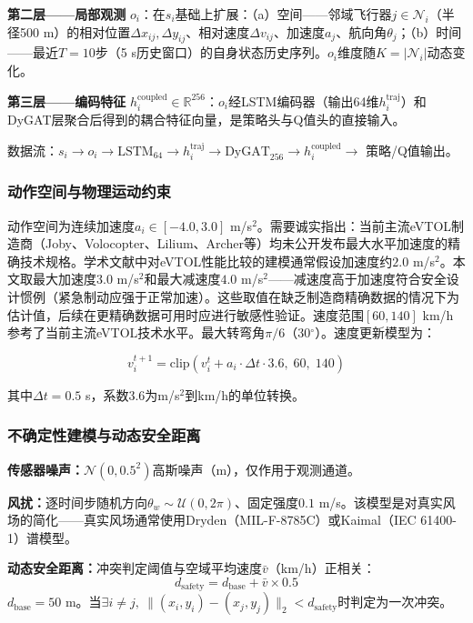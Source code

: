 \documentclass[12pt,a4paper,UTF8]{ctexart}
\begin{document}
\textbf{第二层——局部观测} $o_i$：在$s_i$基础上扩展：（a）空间——邻域飞行器$j \in \mathcal{N}_i$（半径500 m）的相对位置$\Delta x_{ij}, \Delta y_{ij}$、相对速度$\Delta v_{ij}$、加速度$a_j$、航向角$\theta_j$；（b）时间——最近$T=10$步（5 s历史窗口）的自身状态历史序列。$o_i$维度随$K = |\mathcal{N}_i|$动态变化。

\textbf{第三层——编码特征} $h_i^{\text{coupled}} \in \mathbb{R}^{256}$：$o_i$经LSTM编码器（输出64维$h_i^{\text{traj}}$）和DyGAT层聚合后得到的耦合特征向量，是策略头与Q值头的直接输入。

数据流：$s_i \to o_i \to \text{LSTM}_{64} \to h_i^{\text{traj}} \to \text{DyGAT}_{256} \to h_i^{\text{coupled}} \to$ 策略/Q值输出。

\subsubsection{动作空间与物理运动约束}

动作空间为连续加速度$a_i \in [-4.0, 3.0]$ m/s$^2$。需要诚实指出：当前主流eVTOL制造商（Joby、Volocopter、Lilium、Archer等）均未公开发布最大水平加速度的精确技术规格。学术文献中对eVTOL性能比较的建模通常假设加速度约$2.0$ m/s$^2$\cite{ref25}。本文取最大加速度$3.0$ m/s$^2$和最大减速度$4.0$ m/s$^2$——减速度高于加速度符合安全设计惯例（紧急制动应强于正常加速）。这些取值在缺乏制造商精确数据的情况下为估计值，后续在更精确数据可用时应进行敏感性验证。速度范围$[60, 140]$ km/h参考了当前主流eVTOL技术水平。最大转弯角$\pi/6$（30$^\circ$）。速度更新模型为：

\begin{equation}
    v_i^{t+1} = \text{clip}\!\left(v_i^{t} + a_i \cdot \Delta t \cdot 3.6,\; 60,\; 140\right)
\end{equation}

其中$\Delta t = 0.5$ s，系数3.6为m/s$^2$到km/h的单位转换。

\subsubsection{不确定性建模与动态安全距离}

\textbf{传感器噪声：}$\mathcal{N}(0, 0.5^2)$高斯噪声（m），仅作用于观测通道。

\textbf{风扰：}逐时间步随机方向$\theta_w \sim \mathcal{U}(0, 2\pi)$、固定强度$0.1$ m/s。该模型是对真实风场的简化——真实风场通常使用Dryden（MIL-F-8785C）\cite{ref26}或Kaimal（IEC 61400-1）谱模型。

\textbf{动态安全距离：}冲突判定阈值与空域平均速度$\bar{v}$（km/h）正相关：
\begin{equation}
    d_{\text{safety}} = d_{\text{base}} + \bar{v} \times 0.5
\end{equation}
$d_{\text{base}} = 50$ m。当$\exists i \neq j,\ \|(x_i, y_i) - (x_j, y_j)\|_2 < d_{\text{safety}}$时判定为一次冲突。
\end{document}
